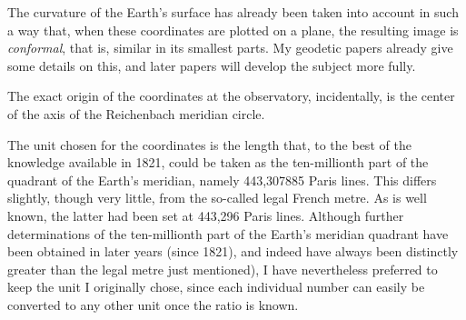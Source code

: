 The curvature of the Earth’s surface has already been taken into account in such a way that, when these coordinates are plotted on a plane, the resulting image is \textit{conformal}, that is, similar in its smallest parts. My geodetic papers already give some details on this, and later papers will develop the subject more fully.

The exact origin of the coordinates at the observatory, incidentally, is the center of the axis of the Reichenbach meridian circle.

The unit chosen for the coordinates is the length that, to the best of the knowledge available in 1821, could be taken as the ten-millionth part of the quadrant of the Earth’s meridian, namely 443,307885 Paris lines. This differs slightly, though very little, from the so-called legal French metre. As is well known, the latter had been set at 443,296 Paris lines. Although further determinations of the ten-millionth part of the Earth’s meridian quadrant have been obtained in later years (since 1821), and indeed have always been distinctly greater than the legal metre just mentioned), I have nevertheless preferred to keep the unit I originally chose, since each individual number can easily be converted to any other unit once the ratio is known.

